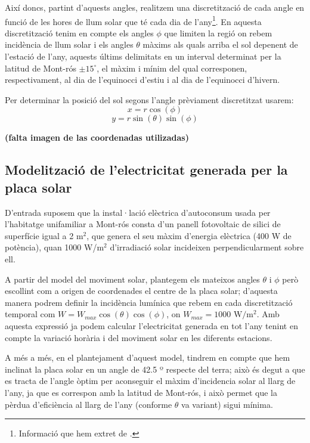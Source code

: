 \documentclass[10pt, twoside, a4paper]{article}
\begin{document}
Així doncs, partint d'aquests angles, realitzem una discretització de cada angle en funció de les hores de llum solar que té cada dia de l'any\footnote{Informació que hem extret de \cite{ref5}.}. En aquesta discretització tenim en compte els angles $\phi$ que limiten la regió on rebem incidència de llum solar i els angles $\theta$ màxims als quals arriba el sol depenent de l'estació de l'any, aquests últims delimitats en un interval determinat per la latitud de Mont-rós $\pm 15^\circ$, el màxim i mínim del qual corresponen, respectivament, al dia de l'equinocci d'estiu i al dia de l'equinocci d'hivern.

Per determinar la posició del sol segons l'angle prèviament discretitzat usarem:
\begin{equation}
    x = r\cos(\phi)
\end{equation}
\begin{equation}
    y = r\sin(\theta)\sin(\phi)
\end{equation}

\textbf{(falta imagen de las coordenadas utilizadas)}

\subsection{Modelització de l'electricitat generada per la placa solar}
D'entrada suposem que la instal·lació elèctrica d'autoconsum usada per l'habitatge unifamiliar a Mont-rós consta d'un panell fotovoltaic de silici de superfície igual a 2 m$^2$, que genera el seu màxim d'energia elèctrica (400 W de potència), quan 1000 W/m$^2$ d'irradiació solar incideixen perpendicularment sobre ell.

A partir del model del moviment solar, plantegem els mateixos angles $\theta$ i $\phi$ però escollint com a origen de coordenades el centre de la placa solar; d'aquesta manera podrem definir la incidència lumínica que rebem en cada discretització temporal com $W = W_{max}\cos(\theta)\cos(\phi)$, on $W_{max} = 1000 \text{ W/m$^2$}$. Amb aquesta expressió ja podem calcular l'electricitat generada en tot l'any tenint en compte la variació horària i del moviment solar en les diferents estacions.

A més a més, en el plantejament d'aquest model, tindrem en compte que  hem inclinat la placa solar en un angle de 42.5 º respecte del terra; això és degut a que es tracta de l'angle òptim per aconseguir el màxim d'incidencia solar al llarg de l'any, ja que es correspon amb la latitud de Mont-rós, i això permet que la pèrdua d'eficiència al llarg de l'any (conforme $\theta$ va variant) sigui mínima.
\end{document}
